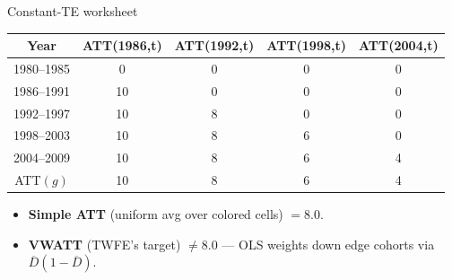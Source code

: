 \documentclass[aspectratio=169,11pt]{beamer}
\begin{document}
\begin{frame}{Constant-TE worksheet}
\begin{center}\footnotesize
\begin{tabular}{c|cccc}
\toprule
\textbf{Year} & \textbf{ATT(1986,t)} & \textbf{ATT(1992,t)} & \textbf{ATT(1998,t)} & \textbf{ATT(2004,t)} \\
\midrule
1980--1985 & 0 & 0 & 0 & 0 \\
1986--1991 & \cellcolor{forest!18}10 & 0 & 0 & 0 \\
1992--1997 & \cellcolor{forest!18}10 & \cellcolor{ocean!22}8 & 0 & 0 \\
1998--2003 & \cellcolor{forest!18}10 & \cellcolor{ocean!22}8 & \cellcolor{gold!28}6 & 0 \\
2004--2009 & \cellcolor{forest!18}10 & \cellcolor{ocean!22}8 & \cellcolor{gold!28}6 & \cellcolor{harvardcrimson!18}4 \\
\midrule
ATT$(g)$ & 10 & 8 & 6 & 4 \\
\bottomrule
\end{tabular}
\end{center}

\vspace{0.4em}
\begin{itemize}\small
  \item \textbf{Simple ATT} (uniform avg over colored cells) $= 8.0$.
  \item \textbf{VWATT} (TWFE's target) $\neq 8.0$ --- OLS weights down edge cohorts via $\overline{D}(1-\overline{D})$.
\end{itemize}
\end{frame}
\end{document}
